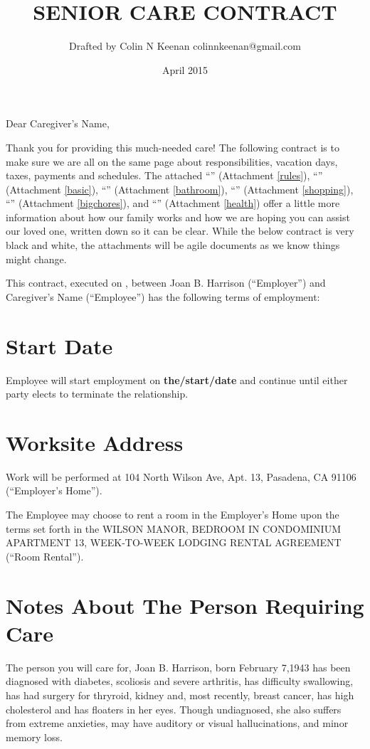 \documentclass[]{article}
\newcommand{\mytitle}{SENIOR CARE CONTRACT}
\newcommand{\agreementtitle}{WILSON MANOR, BEDROOM IN CONDOMINIUM APARTMENT 13, WEEK-TO-WEEK LODGING RENTAL AGREEMENT}
\newcommand{\startdate}{the/start/date}
\newcommand{\datefillin}{\hspace{0.2cm}\makebox[3cm]{\hrulefill}}
\newcommand{\caregiver}{Caregiver's Name}
\newcommand{\mom}{Joan B. Harrison}
\begin{document}
\title{\mytitle{}}
\author{Drafted by Colin N Keenan colinnkeenan@gmail.com}
\date{April 2015}
\maketitle
\thispagestyle{fancy}

\noindent \hrulefill

Dear \caregiver{},

Thank you for providing this much-needed care! The following contract is to make sure we are all on the same page about responsibilities, vacation days, taxes, payments and schedules. The attached ``'' (Attachment \ref{rules}), ``\basic{}'' (Attachment \ref{basic}), ``\bathroom{}'' (Attachment \ref{bathroom}), ``\shopping{}'' (Attachment \ref{shopping}), ``\bigchores{}'' (Attachment \ref{bigchores}), and ``\health{}'' (Attachment \ref{health}) offer a little more information about how our family works and how we are hoping you can assist our loved one, written down so it can be clear. While the below contract is very black and white, the attachments will be agile documents as we know things might change.

This contract, executed on \datefillin{}, between \mom{} (``Employer'') and \caregiver{} (``Employee'') has the following terms of employment:

\section{Start Date}

Employee will start employment on \textbf{\startdate{}} and continue until either party elects to terminate the relationship.

\section{Worksite Address}

Work will be performed at 104 North Wilson Ave, Apt. 13, Pasadena, CA 91106 (``Employer's Home'').

The Employee may choose to rent a room in the Employer's Home upon the terms set forth in the \agreementtitle{} (``Room Rental'').

\section{Notes About The Person Requiring Care}

The person you will care for, \mom{}, born February 7,1943 has been diagnosed with diabetes, scoliosis and severe arthritis, has difficulty swallowing, has had surgery for thryroid, kidney and, most recently, breast cancer, has high cholesterol and has floaters in her eyes. Though undiagnosed, she also suffers from extreme anxieties, may have auditory or visual hallucinations, and minor memory loss.
\end{document}
